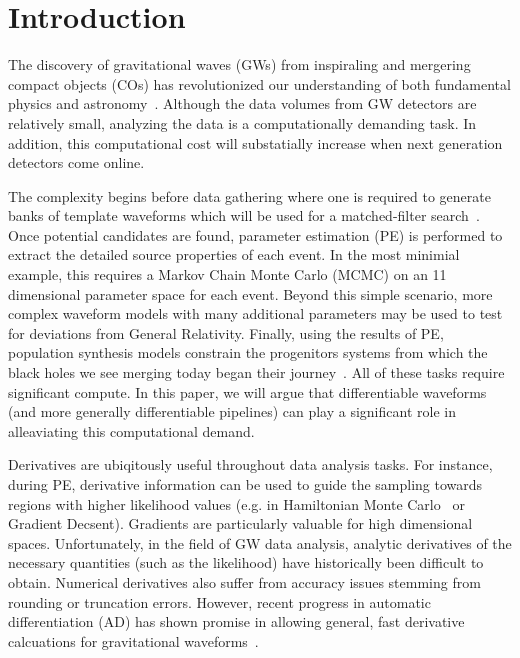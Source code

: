 \documentclass[twocolumn]{aastex631}
\begin{document}
\section{Introduction}
\label{sec:intro}


The discovery of gravitational waves (GWs) from inspiraling and mergering compact objects (COs) has revolutionized our understanding of both fundamental physics and astronomy~\citep{LIGOScientific:2021djp}.
Although the data volumes from GW detectors are relatively small, analyzing the data is a computationally demanding task.
In addition, this computational cost will substatially increase when next generation detectors come online.

The complexity begins before data gathering where one is required to generate banks of template waveforms which will be used for a matched-filter search~\citep{Owen:1998dk, Owen:1995tm}. 
Once potential candidates are found, parameter estimation (PE) is performed to extract the detailed source properties of each event.
In the most minimial example, this requires a Markov Chain Monte Carlo (MCMC) on an 11 dimensional parameter space for each event.
Beyond this simple scenario, more complex waveform models with many additional parameters may be used to test for deviations from General Relativity.
Finally, using the results of PE, population synthesis models constrain the progenitors systems from which the black holes we see merging today began their journey~\citep{Wong:2022flg}.
All of these tasks require significant compute.
In this paper, we will argue that differentiable waveforms (and more generally differentiable pipelines) can play a significant role in alleaviating this computational demand.

Derivatives are ubiqitously useful throughout data analysis tasks.
For instance, during PE, derivative information can be used to guide the sampling towards regions with higher likelihood values (e.g. in Hamiltonian Monte Carlo~\citep{2017arXiv170102434B} or Gradient Decsent).
Gradients are particularly valuable for high dimensional spaces.
Unfortunately, in the field of GW data analysis, analytic derivatives of the necessary quantities (such as the likelihood) have historically been difficult to obtain.
Numerical derivatives also suffer from accuracy issues stemming from rounding or truncation errors.
However, recent progress in automatic differentiation (AD) has shown promise in allowing general, fast derivative calcuations for gravitational waveforms~\citep{Coogan:2022qxs}.
\end{document}
